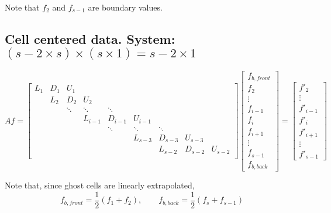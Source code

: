 \documentclass[11pt]{article}
\begin{document}
Note that $f_2$ and $f_{s-1}$ are boundary values.

\subsection{Cell centered data. System:
\texorpdfstring{$ (s-2 \times s) \times (s \times 1) = s-2 \times 1$}{}}

\[ Af = \left[
\begin{array}{ccccccccc}
L_{1} & D_{1}    & U_{1}     &           &           &           &       &         & \\
      & L_{2} & D_{2}    & U_{2}     &           &           &           &         & \\
      &       & \ddots   & \ddots    & \ddots    &           &           &         & \\
      &       &          & L_{i-1}   & D_{i-1}   & U_{i-1}   &           &         & \\
      &       &          &           & \ddots    & \ddots    & \ddots    &         & \\
      &       &          &           &           & L_{s-3}   & D_{s-3}   & U_{s-3} & \\
      &      &       &          &           &           & L_{s-2}   & D_{s-2}   & U_{s-2} \\
\end{array} \right] 
\left[ \begin{array}{c}
f_{b,front} \\ f_{2} \\ \vdots \\ f_{i-1} \\ f_{i} \\ f_{i+1} \\ \vdots \\ f_{s-1} \\ f_{b,back}
\end{array} \right]
=
\left[ \begin{array}{c}
f'_{2} \\ \vdots \\ f'_{i-1} \\ f'_{i} \\ f'_{i+1} \\ \vdots \\ f'_{s-1}
\end{array} \right]
\]

Note that, since ghost cells are linearly extrapolated,
\begin{equation}
      f_{b,front} = \frac{1}{2} (f_1 + f_2)
      ,\qquad
      f_{b,back} = \frac{1}{2} (f_s + f_{s-1})
\end{equation}
\end{document}
